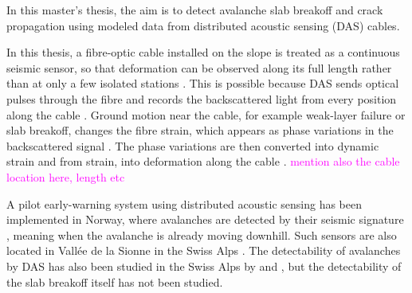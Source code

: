   In this master's thesis, the aim is to detect avalanche slab breakoff and crack propagation using modeled data from distributed acoustic sensing (DAS) cables. \par

  In this thesis, a fibre-optic cable installed on the slope is treated as a continuous seismic sensor, so that deformation can be observed along its full length rather than at only a few isolated stations \parencite{parkerDistributedAcousticSensing2014}. This is possible because DAS sends optical pulses through the fibre and records the backscattered light from every position along the cable \parencite{shatalinInterferometricOpticalTimedomain1998}. Ground motion near the cable, for example weak-layer failure or slab breakoff, changes the fibre strain, which appears as phase variations in the backscattered signal \parencite{hartogIntroductionDistributedOptical2017}. The phase variations are then converted into dynamic strain and from strain, into deformation along the cable \parencite{trabattoniStrainDisplacementUsing2023}. \textcolor{magenta}{mention also the cable location here, length etc} \par 

  
  A pilot early-warning system using distributed acoustic sensing has been implemented in Norway, where avalanches are detected by their seismic signature \parencite{turquetAutomatedSnowAvalanche2024}, meaning when the avalanche is already moving downhill. Such sensors are also located in Vallée de la Sionne in the Swiss Alps \parencite{paitzPhenomenologyAvalancheRecordings2023}. The detectability of avalanches by DAS has also been studied in the Swiss Alps by \cite{paitzPhenomenologyAvalancheRecordings2023} and \cite{edmeFiberopticDetectionSnow2023}, but the detectability of the slab breakoff itself has not been studied. 

  
  
